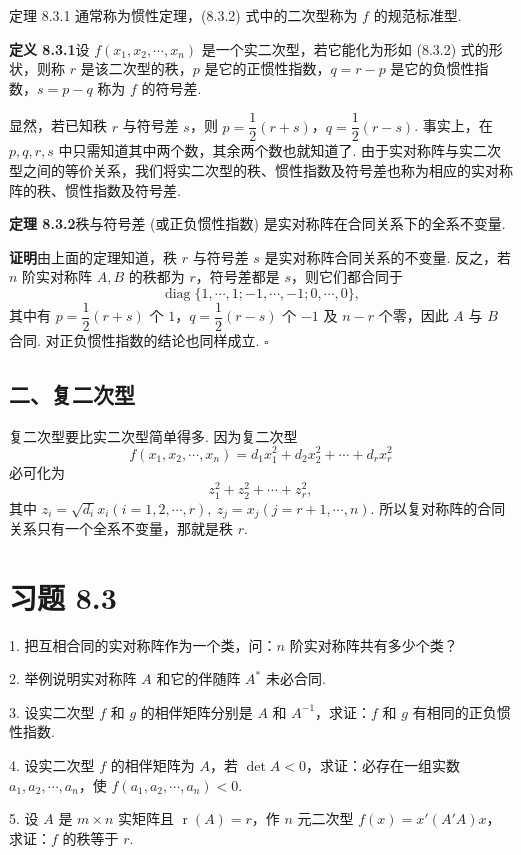 \documentclass[UTF8,12pt,a4paper,fontset=fandol]{ctexart}
\begin{document}
定理 8.3.1 通常称为惯性定理，(8.3.2) 式中的二次型称为 $f$ 的规范标准型.

\noindent\textbf{定义 8.3.1}\quad 设 $f(x_1,x_2,\cdots,x_n)$ 是一个实二次型，若它能化为形如 (8.3.2) 式的形状，则称 $r$ 是该二次型的秩，$p$ 是它的正惯性指数，$q=r-p$ 是它的负惯性指数，$s=p-q$ 称为 $f$ 的符号差.

显然，若已知秩 $r$ 与符号差 $s$，则 $p=\dfrac12(r+s)$，$q=\dfrac12(r-s)$. 事实上，在 $p,q,r,s$ 中只需知道其中两个数，其余两个数也就知道了. 由于实对称阵与实二次型之间的等价关系，我们将实二次型的秩、惯性指数及符号差也称为相应的实对称阵的秩、惯性指数及符号差.

\noindent\textbf{定理 8.3.2}\quad 秩与符号差 (或正负惯性指数) 是实对称阵在合同关系下的全系不变量.

\noindent\textbf{证明}\quad 由上面的定理知道，秩 $r$ 与符号差 $s$ 是实对称阵合同关系的不变量. 反之，若 $n$ 阶实对称阵 $A,B$ 的秩都为 $r$，符号差都是 $s$，则它们都合同于
\[
\operatorname{diag}\{1,\cdots,1;-1,\cdots,-1;0,\cdots,0\},
\]
其中有 $p=\dfrac12(r+s)$ 个 $1$，$q=\dfrac12(r-s)$ 个 $-1$ 及 $n-r$ 个零，因此 $A$ 与 $B$ 合同. 对正负惯性指数的结论也同样成立. $\square$

\subsection*{二、复二次型}

复二次型要比实二次型简单得多. 因为复二次型
\[
f(x_1,x_2,\cdots,x_n)=d_1x_1^2+d_2x_2^2+\cdots+d_rx_r^2
\]
必可化为
\[
z_1^2+z_2^2+\cdots+z_r^2,
\]
其中 $z_i=\sqrt{d_i}x_i(i=1,2,\cdots,r),\ z_j=x_j(j=r+1,\cdots,n)$. 所以复对称阵的合同关系只有一个全系不变量，那就是秩 $r$.

\section*{习题 8.3}

1. 把互相合同的实对称阵作为一个类，问：$n$ 阶实对称阵共有多少个类？

2. 举例说明实对称阵 $A$ 和它的伴随阵 $A^*$ 未必合同.

3. 设实二次型 $f$ 和 $g$ 的相伴矩阵分别是 $A$ 和 $A^{-1}$，求证：$f$ 和 $g$ 有相同的正负惯性指数.

4. 设实二次型 $f$ 的相伴矩阵为 $A$，若 $\det A<0$，求证：必存在一组实数 $a_1,a_2,\cdots,a_n$，使 $f(a_1,a_2,\cdots,a_n)<0$.

5. 设 $A$ 是 $m\times n$ 实矩阵且 $\operatorname{r}(A)=r$，作 $n$ 元二次型 $f(x)=x'(A'A)x$，求证：$f$ 的秩等于 $r$.
\end{document}
